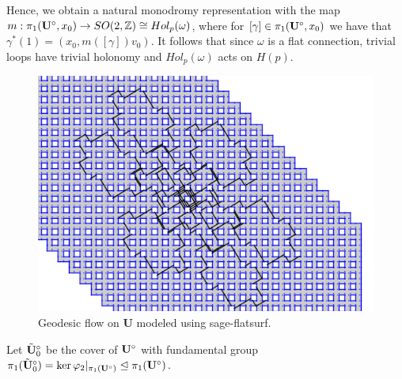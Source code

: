 \documentclass[]{article}
\def\btUos{\btU_0^\circ}
\begin{document}
Hence, we obtain a natural monodromy representation with the map $m:\pi_1(\mathbf{U}^\circ,x_0)\rightarrow SO(2,\mathbb{Z})\cong Hol_p(\omega)$, where for $[\gamma]\in\pi_1(\mathbf{U}^\circ,x_0)$ we have that $\gamma^*(1)=(x_0,m([\gamma])v_0)$. It follows that since $\omega$ is a flat connection, trivial loops have trivial holonomy and $Hol_p(\omega)$ acts on $H(p)$.

\begin{figure}[H]
\centering
\includegraphics[width=4in.]{closed2.png}
\caption{Geodesic flow on $\mathbf{U}$ modeled using sage-flatsurf.}
\label{fig:complicated}
\end{figure}

\begin{Def}
Let $\btUos$ be the cover of $\mathbf{U}^\circ$ with fundamental group $\pi_1(\btUos)=\ker\varphi_2|_{\pi_1(\bUs)}\trianglelefteq \pi_1(\bUs)$.
\end{Def}
\end{document}
